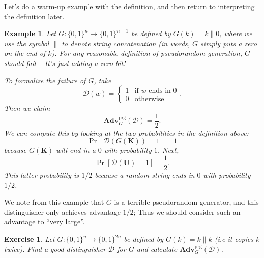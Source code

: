 \documentclass[11pt]{article}
\newtheorem{exercise}{Exercise}
\newtheorem{example}{Example}
\newcommand{\calD}{\mathcal{D}}
\newcommand{\Adv}{\mathbf{Adv}}
\newcommand{\AdvPRG}[2]{\Adv^{\mathrm{prg}}_{#1}({#2})}
\newcommand{\bits}{\{0,1\}}
\newcommand{\bK}{\mathbf{K}}
\newcommand{\bU}{\mathbf{U}}
\begin{document}
Let's do a warm-up example with the definition, and then return
to interpreting the definition later. 
\begin{example}
    Let $G:\bits^n\to\bits^{n+1}$ be defined by $G(k)=k\|0$, where we use
    the symbol $\|$ to denote string concatenation (in words, $G$ simply
    puts a zero on the end of $k$). For any reasonable definition of
    pseudorandom generation, $G$ should fail -- It's just adding a zero
    bit!

    To formalize the failure of $G$, take
    \[
        \calD(w) =
        \begin{cases}
            1 & \text{if $w$ ends in $0$}\\
            0 & \text{otherwise}
        \end{cases}.
    \]
    Then we claim
    \[
        \AdvPRG{G}{\calD} = \frac{1}{2}.
    \]
    We can compute this by looking at the two probabilities in the
    definition above:
    \[
        \Pr[\calD(G(\bK))=1] = 1
    \]
    because $G(\bK)$ will end in a $0$ with probability $1$.
    Next,
    \[
        \Pr[\calD(\bU)=1] = \frac{1}{2}.
    \]
    This latter probability is $1/2$ because a random string ends in
    $0$ with probability $1/2$.
\end{example}
We note from this example that $G$ is a terrible pseudorandom generator,
and this distinguisher only achieves advantage $1/2$; Thus we should
consider such an advantage to ``very large''.

\begin{exercise}
    Let $G:\bits^n\to\bits^{2n}$ be defined by $G(k)=k\|k$ (i.e it copies
    $k$ twice). Find a good distinguisher $\calD$ for $G$ and calculate
    $\AdvPRG{G}{\calD}$.
\end{exercise}
\end{document}
